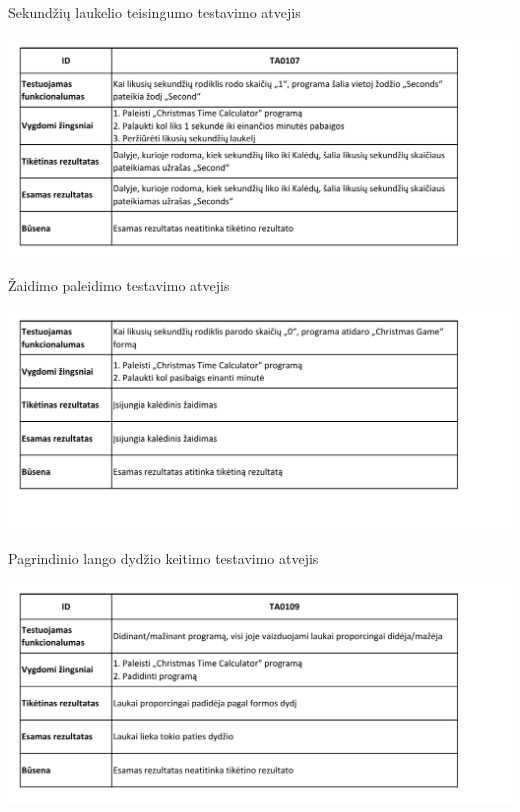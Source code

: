 \documentclass{VUMIFPSkursinis}
\begin{document}
				\begin{table}[H]
					\centering
					\caption{Sekundžių laukelio teisingumo testavimo atvejis}
					\includegraphics[width=\textwidth]{TA/TA0107}			
					\label{fig:TA0107}
				\end{table}
				\begin{table}[H]
					\centering
					\caption{Žaidimo paleidimo testavimo atvejis}
					\includegraphics[width=\textwidth]{TA/TA0108}			
					\label{fig:TA0108}
				\end{table}
				\begin{table}[H]
					\centering
					\caption{Pagrindinio lango dydžio keitimo testavimo atvejis}
					\includegraphics[width=\textwidth]{TA/TA0109}			
					\label{fig:TA0109}
				\end{table}
\end{document}
